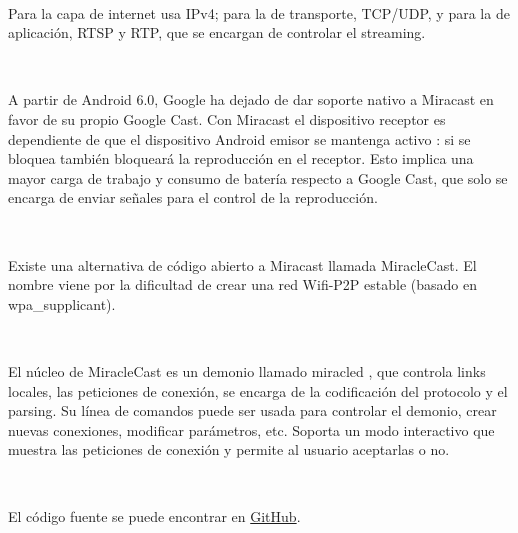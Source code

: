 \

Para la capa de internet usa IPv4; para la de transporte, TCP/UDP, y para la de aplicación, RTSP y RTP, que se encargan de controlar el streaming.

\

A partir de Android 6.0, Google ha dejado de dar soporte nativo a Miracast en favor de su propio Google Cast.
Con Miracast el dispositivo receptor es dependiente de que el dispositivo Android emisor se mantenga activo \cite{Miracast}: si se bloquea también bloqueará la reproducción en el receptor.
Esto implica una mayor carga de trabajo y consumo de batería respecto a Google Cast, que solo se encarga de enviar señales para el control de la reproducción.

\

Existe una alternativa de código abierto a Miracast llamada MiracleCast. El nombre viene por la dificultad de crear una red Wifi-P2P estable (basado en wpa\_supplicant).

\

El núcleo de MiracleCast es un demonio llamado miracled \cite{MiracleCast}, que controla links locales, las peticiones de conexión, se encarga de la codificación del protocolo y el parsing.
Su línea de comandos puede ser usada para controlar el demonio, crear nuevas conexiones, modificar parámetros, etc.
Soporta un modo interactivo que muestra las peticiones de conexión y permite al usuario aceptarlas o no.

\

El código fuente se puede encontrar en \href{https://github.com/albfan/miraclecast}{GitHub}.
